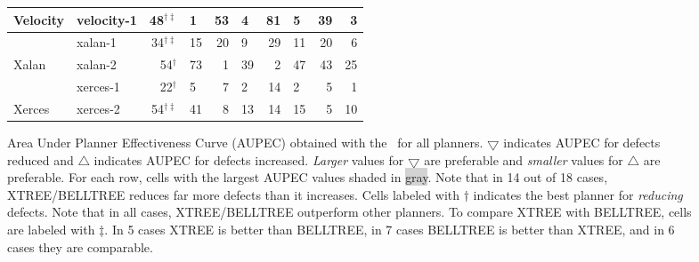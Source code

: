 \begin{figure*}[!htbp]
{{\begin{tabular}{|rl|rl|rl|rl|rr}
\multicolumn{1}{|l|}{Velocity}                 & velocity-1 & \cellcolor[HTML]{C0C0C0}48$^{\dagger\ddagger}$                        & 1                                                & 53            & 4           & 81             & 5             & 39            & 3            \bigstrut\\ \hline
\multicolumn{1}{|l|}{}                         & xalan-1    & \cellcolor[HTML]{C0C0C0}34$^{\dagger\ddagger}$                                              & 15                                               & 20           & 9           & 29             & 11             & 20            & 6             \bigstrut[t]\\
\multicolumn{1}{|l|}{\multirow{-2}{*}{Xalan}}  & xalan-2    & 54$^{\dagger}$                                                                      & \cellcolor[HTML]{C0C0C0}73 & 1            & 39          & 2             & 47            & 43            & 25            \bigstrut[b]\\ \hline
\multicolumn{1}{|l|}{}                         & xerces-1   & \cellcolor[HTML]{C0C0C0}22$^{\dagger}$                                              & 5                                                & 7           & 2           & 14             & 2             & 5             & 1             \bigstrut[t]\\
\multicolumn{1}{|l|}{\multirow{-2}{*}{Xerces}} & xerces-2   & \cellcolor[HTML]{C0C0C0}54$^{\dagger\ddagger}$                                                                      & 41 & 8           & 13          & 14            & 15            & 5             & 10  \bigstrut[b]\\      
\end{tabular}}
\label{subfig:cp}}
\caption{\small{Area Under Planner Effectiveness Curve (AUPEC) obtained with the \ktest~for all planners. $\bigtriangledown$ indicates AUPEC for defects reduced and $\bigtriangleup$ indicates AUPEC for defects increased. \textit{Larger} values for $\bigtriangledown$ are preferable and \textit{smaller} values for $\bigtriangleup$ are preferable. For each row,
cells with the largest AUPEC values shaded in \colorbox{lightgray}{gray}. Note that in 14 out of 18 cases, XTREE/BELLTREE reduces far more defects than it increases. Cells labeled with ${\dagger}$ indicates the best planner for \textit{reducing} defects. Note that in all cases, XTREE/BELLTREE outperform other planners. To compare XTREE with BELLTREE, cells are labeled with ${\ddagger}$. In 5 cases XTREE is better than BELLTREE, in 7 cases BELLTREE is better than XTREE, and in 6 cases they are comparable.}}
\label{fig:results}
\end{figure*}